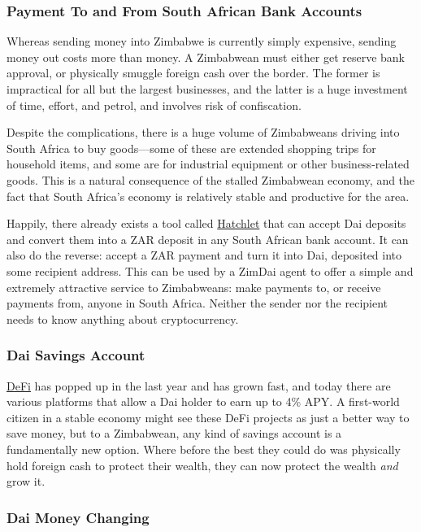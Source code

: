 \documentclass{article}
\begin{document}
\subsubsection{Payment To and From South African Bank Accounts} \label{south african accounts}

Whereas sending money into Zimbabwe is currently simply expensive, sending money out costs more than money. A Zimbabwean must either get reserve bank approval, or physically smuggle foreign cash over the border. The former is impractical for all but the largest businesses, and the latter is a huge investment of time, effort, and petrol, and involves risk of confiscation.

Despite the complications, there is a huge volume of Zimbabweans driving into South Africa to buy goods---some of these are extended shopping trips for household items, and some are for industrial equipment or other business-related goods. This is a natural consequence of the stalled Zimbabwean economy, and the fact that South Africa's economy is relatively stable and productive for the area.

Happily, there already exists a tool called \href{https://hatchlet.co/}{Hatchlet} that can accept Dai deposits and convert them into a ZAR deposit in any South African bank account. It can also do the reverse: accept a ZAR payment and turn it into Dai, deposited into some recipient address. This can be used by a ZimDai agent to offer a simple and extremely attractive service to Zimbabweans: make payments to, or receive payments from, anyone in South Africa. Neither the sender nor the recipient needs to know anything about cryptocurrency.

\subsubsection{Dai Savings Account} \label{savings}

\href{https://blockonomi.com/what-is-decentralized-finance-defi/}{DeFi} has popped up in the last year and has grown fast, and today there are various platforms that allow a Dai holder to earn up to 4\% APY. A first-world citizen in a stable economy might see these DeFi projects as just a better way to save money, but to a Zimbabwean, any kind of savings account is a fundamentally new option. Where before the best they could do was physically hold foreign cash to protect their wealth, they can now protect the wealth \textit{and} grow it.

\subsubsection{Dai Money Changing} \label{dai money changing}
\end{document}
